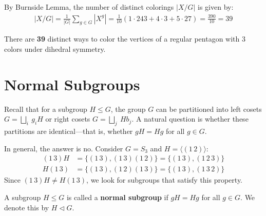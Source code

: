 \begin{example}
\begin{center}


\end{center}
By Burnside Lemma, the number of distinct colorings $|X/G|$ is given by:
\begin{align*} |X/G| = \frac{1}{|G|} \sum_{g \in G} |X^g|   = \frac{1}{10} \left( 1 \cdot 243 + 4 \cdot 3 + 5 \cdot 27 \right) = \frac{390}{10} = 39 \end{align*}

There are \textbf{39} distinct ways to color the vertices of a regular pentagon with 3 colors under dihedral symmetry.
\end{example}




\section{Normal Subgroups}
Recall that for a subgroup $H \le G$, the group $G$ can be partitioned into left cosets $G = \bigsqcup_i\ g_i H$ or right cosets $G = \bigsqcup_j\ H b_j$. A natural question is whether these partitions are identical—that is, whether $gH = Hg$ for all $g \in G$.

In general, the answer is no. Consider $G = S_3$ and $H = \langle (1\,2) \rangle$:
\begin{align*}
(1\,3)H &= \{ (1\,3), (1\,3)(1\,2) \} = \{ (1\,3), (1\,2\,3) \} \\
H(1\,3) &= \{ (1\,3), (1\,2)(1\,3) \} = \{ (1\,3), (1\,3\,2) \}
\end{align*}
Since $(1\,3)H \neq H(1\,3)$, we look for subgroups that satisfy this property.

\begin{definition}
A subgroup $H \le G$ is called a \textbf{normal subgroup} if $gH = Hg$ for all $g \in G$. We denote this by $H \triangleleft G$.
\end{definition}

